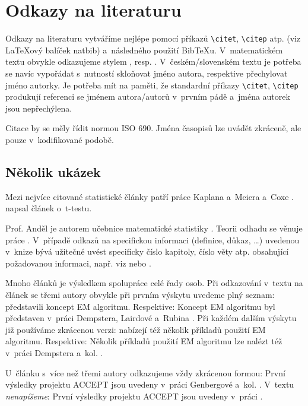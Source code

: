 
\chapter{Odkazy na literaturu}

Odkazy na literaturu vytváříme nejlépe pomocí příkazů
\verb|\citet|, \verb|\citep| atp.
(viz {\LaTeX}ový balíček \textsf{natbib}) a~následného použití
Bib{\TeX}u. V~matematickém textu obvykle odkazujeme stylem , resp. . V~českém/slovenském textu je potřeba se navíc vypořádat
s~nutností skloňovat jméno autora, respektive přechylovat jméno
autorky. Je potřeba mít na paměti, že standardní příkazy
\verb|\citet|, \verb|\citep|
produkují referenci se jménem autora/autorů v~prvním pádě a~jména
autorek jsou nepřechýlena.

Citace by se měly řídit normou ISO 690.
Jména časopisů lze uvádět zkráceně, ale pouze v~kodifikované podobě.

\section{Několik ukázek}

Mezi nejvíce citované statistické články patří práce Kaplana a~Meiera a~Coxe
\citep{KaplanMeier58, Cox72}. \citet{Student08} napsal článek o~t-testu.

Prof. Anděl je autorem učebnice matematické statistiky
\citep[viz][]{Andel98}. Teorii odhadu se věnuje práce
\citet{LehmannCasella98}. V~případě odkazů na specifickou informaci
(definice, důkaz, \dots) uvedenou v~knize bývá užitečné uvést
specificky číslo kapitoly, číslo věty atp. obsahující požadovanou
informaci, např. viz \citet[Věta 4.22]{Andel07} nebo \citep[viz][Věta
4.22]{Andel07}.

Mnoho článků je výsledkem spolupráce celé řady osob. Při odkazování
v~textu na článek se třemi autory obvykle při prvním výskytu uvedeme
plný seznam: \citet*{DempsterLairdRubin77} představili koncept EM
algoritmu. Respektive: Koncept EM algoritmu byl představen v~práci
Dempstera, Lairdové a~Rubina \citep*{DempsterLairdRubin77}. Při každém
dalším výskytu již používáme zkrácenou verzi:
\citet{DempsterLairdRubin77} nabízejí též několik příkladů použití EM
algoritmu. Respektive: Několik příkladů použití EM algoritmu lze
nalézt též v~práci Dempstera a~kol. \citep{DempsterLairdRubin77}.

U~článku s~více než třemi autory odkazujeme vždy zkrácenou formou:
První výsledky projektu ACCEPT jsou uvedeny v~práci Genbergové a~kol.
\citep{Genberget08}. V~textu \emph{nenapíšeme}: První výsledky
projektu ACCEPT jsou uvedeny v~práci \citet*{Genberget08}.
